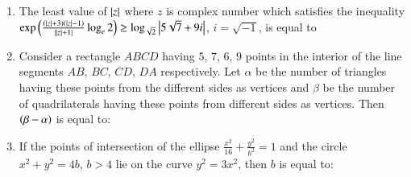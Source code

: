 \documentclass[journal,12pt,onecolumn]{IEEEtran}
\theoremstyle{remark}
\begin{document}
\begin{enumerate}
\hfill{}
\begin{enumerate}
\end{enumerate}

\item The least value of $\left\vert z\right\vert$ where $z$ is complex number which satisfies the inequality $\exp\left(\frac{\left(\left\vert z\right\vert+3\right)\left(\left\vert z\right\vert-1\right)}{\left\vert{\left\vert z\right\vert+1}\right\vert}\log_e{2}\right)\ge\log_{\sqrt{2}}{\left\vert5\sqrt{7}+9i\right\vert}$, $i=\sqrt{-1}$, is equal to

\hfill{}
\begin{enumerate}
\end{enumerate}

\item Consider a rectangle $ABCD$ having $5$, $7$, $6$, $9$ points in the interior of the line segments $AB$, $BC$, $CD$, $DA$ respectively. Let $\alpha$ be the number of triangles having these points from the different sides as vertices and $\beta$ be the number of quadrilaterals having these points from different sides as vertices. Then $\left(\beta-\alpha\right)$ is equal to: 

\hfill{}
\begin{enumerate}
\end{enumerate}

\item If the points of intersection of the ellipse $\frac{x^2}{16}+\frac{y^2}{b^2}=1$ and the circle $x^2+y^2=4b$, $b>4$ lie on the curve $y^2=3x^2$, then $b$ is equal to:

\hfill{}
\begin{enumerate}
\end{enumerate}


\end{enumerate}
\end{document}
